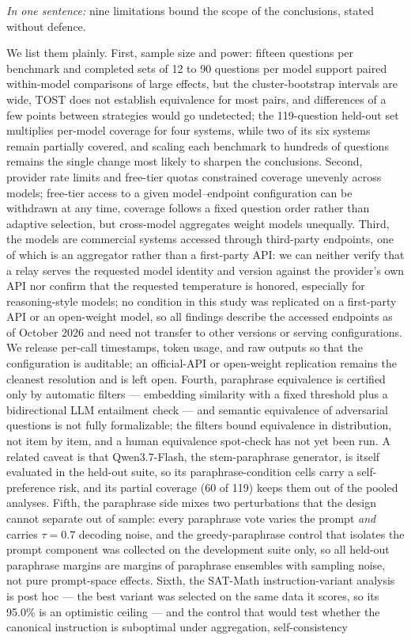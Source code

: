 \emph{In one sentence:} nine limitations bound the scope of the conclusions, stated without defence.

We list them plainly. First, sample size and power: fifteen questions per benchmark and completed sets of 12 to 90 questions per model support paired within-model comparisons of large effects, but the cluster-bootstrap intervals are wide, TOST does not establish equivalence for most pairs, and differences of a few points between strategies would go undetected; the 119-question held-out set multiplies per-model coverage for four systems, while two of its six systems remain partially covered, and scaling each benchmark to hundreds of questions remains the single change most likely to sharpen the conclusions. Second, provider rate limits and free-tier quotas constrained coverage unevenly across models; free-tier access to a given model--endpoint configuration can be withdrawn at any time, coverage follows a fixed question order rather than adaptive selection, but cross-model aggregates weight models unequally. Third, the models are commercial systems accessed through third-party endpoints, one of which is an aggregator rather than a first-party API: we can neither verify that a relay serves the requested model identity and version against the provider's own API nor confirm that the requested temperature is honored, especially for reasoning-style models; no condition in this study was replicated on a first-party API or an open-weight model, so all findings describe the accessed endpoints as of October 2026 and need not transfer to other versions or serving configurations. We release per-call timestamps, token usage, and raw outputs so that the configuration is auditable; an official-API or open-weight replication remains the cleanest resolution and is left open. Fourth, paraphrase equivalence is certified only by automatic filters --- embedding similarity with a fixed threshold plus a bidirectional LLM entailment check --- and semantic equivalence of adversarial questions is not fully formalizable; the filters bound equivalence in distribution, not item by item, and a human equivalence spot-check has not yet been run. A related caveat is that Qwen3.7-Flash, the stem-paraphrase generator, is itself evaluated in the held-out suite, so its paraphrase-condition cells carry a self-preference risk, and its partial coverage (60 of 119) keeps them out of the pooled analyses. Fifth, the paraphrase side mixes two perturbations that the design cannot separate out of sample: every paraphrase vote varies the prompt \emph{and} carries $\tau = 0.7$ decoding noise, and the greedy-paraphrase control that isolates the prompt component was collected on the development suite only, so all held-out paraphrase margins are margins of paraphrase ensembles with sampling noise, not pure prompt-space effects. Sixth, the SAT-Math instruction-variant analysis is post hoc --- the best variant was selected on the same data it scores, so its 95.0\% is an optimistic ceiling --- and the control that would test whether the canonical instruction is suboptimal under aggregation, self-consistency 